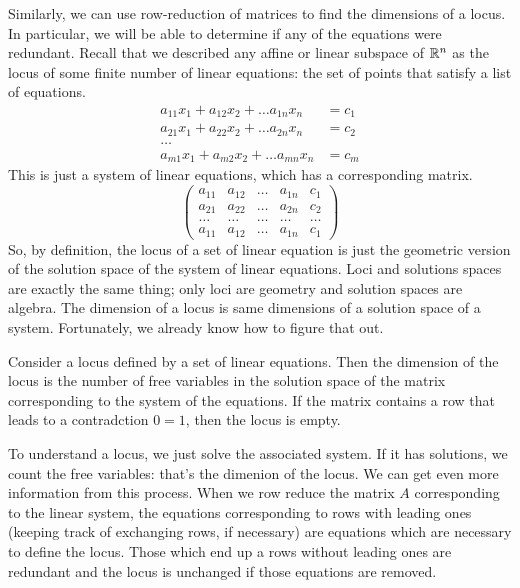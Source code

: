 \documentclass[fleqn]{report}
\begin{document}
Similarly, we can use row-reduction of matrices to find the
dimensions of a locus. In particular, we will be able to
determine if any of the equations were redundant. 
Recall that we described any affine or linear
subspace of $\mathbb{R}^n$ as the locus of some finite number of
linear equations: the set of points
that satisfy a list of equations.
\begin{align*}
a_{11} x_1 + a_{12} x_2 + \ldots a_{1n} x_n & = c_1 \\
a_{21} x_1 + a_{22} x_2 + \ldots a_{2n} x_n & = c_2 \\
\ldots & \\
a_{m1} x_1 + a_{m2} x_2 + \ldots a_{mn} x_n & = c_m
\end{align*}
This is just a system of linear equations, which has a
corresponding matrix.
\begin{displaymath}
\left(
\begin{array}{cccc|c}
a_{11} & a_{12} & \ldots & a_{1n} & c_1 \\
a_{21} & a_{22} & \ldots & a_{2n} & c_2 \\
\ldots & \ldots & \ldots & \ldots & \ldots \\
a_{11} & a_{12} & \ldots & a_{1n} & c_1 
\end{array}
\right)
\end{displaymath}
So, by definition, the locus of a set of linear equation is just
the geometric version of the solution space of the system of linear
equations. Loci and solutions spaces are exactly the same
thing; only loci are geometry and solution
spaces are algebra. The dimension of a locus is same
dimensions of a solution space of a system. Fortunately, we
already know how to figure that out. 

\begin{prop}
Consider a locus defined by a set of linear equations. Then the
dimension of the locus is the number of free variables in the
solution space of the matrix corresponding to the
system of the equations. If the matrix contains a row
that leads to a contradction $0=1$, then the locus is empty.
\end{prop}

To understand a locus, we just solve the associated system.
If it has solutions, we count the free variables: that's the
dimenion of the locus. We can get even more information from
this process. When we row reduce the matrix $A$ corresponding
to the linear system, the equations corresponding to rows
with leading ones (keeping track of exchanging rows, if
necessary) are equations which are necessary to define the
locus. Those which end up a rows without leading ones are
redundant and the locus is unchanged if those equations are
removed.
\end{document}
